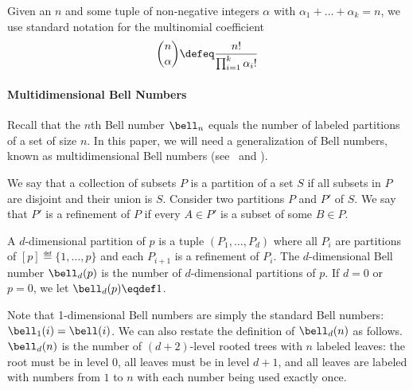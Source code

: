 \documentclass[11pt,a4paper]{article}
\begin{document}
Given an \(n\) and some tuple of non-negative integers \(\alpha\) with \(\alpha_1 + \ldots + \alpha_k = n\), we use standard notation
for the multinomial coefficient
\[\binom{n}{\alpha} \defeq \frac{n!}{\prod_{i=1}^k \alpha_i!}\]




\paragraph{Multidimensional Bell Numbers}
Recall that the \(n\)th Bell number $\bell_n$ equals the number of labeled partitions of a set of size $n$. In this paper, we will need a generalization of Bell numbers, known as multidimensional Bell numbers (see~\cite[Example 5.2.4]{stanley2023enumerative} and \cite{de2011set}).
\begin{definition}
We say that a collection of subsets $P$ is a partition of a set $S$ if all subsets in $P$ are disjoint and their union is $S$.
Consider two partitions $P$ and $P'$ of $S$. We say that $P'$ is a refinement of $P$ if every $A\in P'$ is a subset of some $B\in P$. 

A $d$-dimensional partition of $p$ is a tuple $(P_1,\dots, P_d)$ where all $P_i$ are partitions of $[p] \eqdef \{1,\dots, p\}$ and each $P_{i+1}$ is a refinement of $P_i$. 
The $d$-dimensional Bell number $\bell_{d}(p)$ is the number of $d$-dimensional partitions of $p$. If $d=0$ or $p=0$, we let  $\bell_d(p) \eqdef 1$.
\end{definition}
Note that 1-dimensional Bell numbers are simply the standard Bell numbers: $\bell_1(i) = \bell(i)$. We can also restate the definition of $\bell_d(n)$ as follows. $\bell_d(n)$ is the number of $(d+2)$-level rooted trees with $n$ labeled leaves: the root must be in level \(0\), all leaves must be in level $d+1$, and all leaves are labeled with numbers from $1$ to $n$ with each number being used exactly once.
\end{document}
